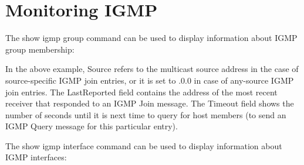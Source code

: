 \newpage
\section{Monitoring IGMP}

The {\stt show igmp group} command can be used to display
information about IGMP group membership:

\vspace{0.1in}
\noindent{}
\vspace{0.1in}

In the above example, {\stt Source} refers to the multicast source
address in the case of source-specific IGMP join entries, or it is set
to {.0.0} in case of any-source IGMP join entries.  The {\stt
LastReported} field contains the address of the most recent receiver
that responded to an IGMP Join message.  The {\stt Timeout} field
shows the number of seconds until it is next time to query for host
members (\ie to send an IGMP Query message for this particular entry).

\vspace{0.1in}
The {\stt show igmp interface} command can be used to display
information about IGMP interfaces:

